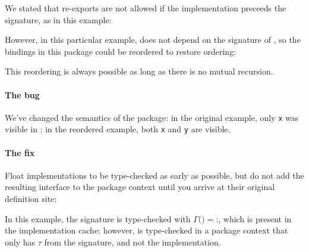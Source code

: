 \documentclass{article}
\begin{document}
We stated that re-exports are not allowed if the implementation preceeds
the signature, as in this example:

\begin{example}
\end{example}

However, in this particular example,  does not depend on the signature of ,
so the bindings in this package could be reordered to restore ordering:

\begin{example}
\end{example}

This reordering is always possible as long as there is no mutual recursion.

\paragraph{The bug} We've changed the semantics of the
package: in the original example, only \verb|x| was visible in ; in
the reordered example, both \verb|x| and \verb|y| are visible.

\paragraph{The fix} Float implementations to be type-checked
as early as possible, but do not add the resulting interface to the package
context until you arrive at their original definition site:

\begin{example}
\end{example}

In this example, the  signature is type-checked with $\Gamma($$) = $:, which is present in the implementation cache; however,  is type-checked in a package context that only has $\tau$ from the signature, and not the implementation.
\end{document}
